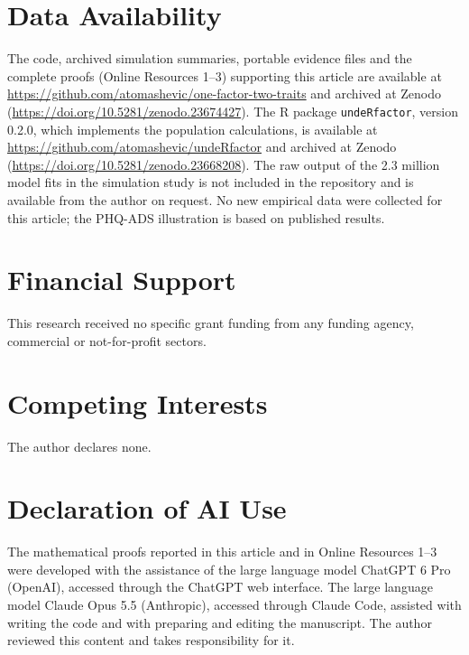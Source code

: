 
\section*{Data Availability}
The code, archived simulation summaries, portable evidence files and the complete proofs (Online Resources 1--3) supporting this article are available at \url{https://github.com/atomashevic/one-factor-two-traits} and archived at Zenodo (\url{https://doi.org/10.5281/zenodo.23674427}). The R package \texttt{undeRfactor}, version 0.2.0, which implements the population calculations, is available at \url{https://github.com/atomashevic/undeRfactor} and archived at Zenodo (\url{https://doi.org/10.5281/zenodo.23668208}). The raw output of the 2.3 million model fits in the simulation study is not included in the repository and is available from the author on request. No new empirical data were collected for this article; the PHQ-ADS illustration is based on published results.

\section*{Financial Support}
This research received no specific grant funding from any funding agency, commercial or not-for-profit sectors.

\section*{Competing Interests}
The author declares none.

\section*{Declaration of AI Use}
The mathematical proofs reported in this article and in Online Resources 1--3 were developed with the assistance of the large language model ChatGPT 6 Pro (OpenAI), accessed through the ChatGPT web interface. The large language model Claude Opus 5.5 (Anthropic), accessed through Claude Code, assisted with writing the code and with preparing and editing the manuscript. The author reviewed this content and takes responsibility for it.

